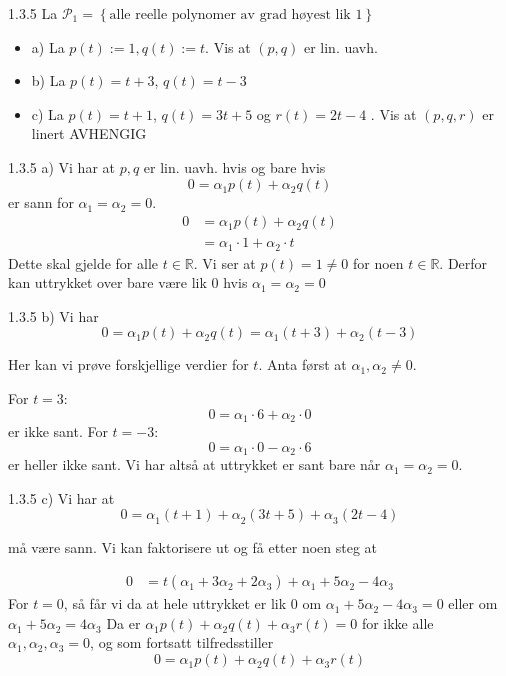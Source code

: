 \documentclass[a4paper,norsk]{article}
\begin{document}
\begin{oppgavebox}{1.3.5}{}
La $ \mathcal{P}_1  = \left\{ \text{alle reelle polynomer av grad høyest lik 1} \right\} $ 
\begin{itemize}
    \item a) La $ p(t):= 1 , q(t) := t$. Vis at $ \left( p, q \right)  $ er lin. uavh.
    \item b) La $ p(t) = t+3 $, $ q(t) = t-3 $  
    \item c) La $ p(t) =t+1 $, $ q(t) = 3t+5 $ og $ r(t) = 2t - 4 $ . Vis at $ \left( p, q, r \right)  $ er linert AVHENGIG
\end{itemize}
\end{oppgavebox}


\begin{proofbox}{1.3.5 a)}{}
Vi har at $ p, q $ er lin. uavh. hvis og bare hvis 
\[
    0 = \alpha_{1}^{} p(t) + \alpha_{2}^{} q(t)
\]
er sann for $ \alpha_{1}^{} =\alpha_{2}^{} =0 $. 
\begin{align*}
    0 &= \alpha_{1}^{} p(t) + \alpha_{2}^{} q(t)\\
    &= \alpha_{1}^{} \cdot 1 + \alpha_{2}^{} \cdot t
\end{align*}
Dette skal gjelde for alle $ t \in  \mathbb{R} $. Vi ser at $ p(t) = 1 \neq 0  $ for noen $ t \in  \mathbb{R} $. Derfor kan uttrykket over bare være lik 0 hvis $ \alpha_{1}^{} = \alpha_{2}^{} =0 $ 
\end{proofbox}

\begin{proofbox}{1.3.5 b)}{}
Vi har
$$
  0 = \alpha_{1} p(t) + \alpha_{2} q(t) = \alpha_{1} \left( t+3 \right)  + \alpha_{2} \left( t-3 \right) 
$$

Her kan vi prøve forskjellige verdier for $t$. Anta først at $\alpha_{1}, \alpha_{2} \neq 0$.

For $t = 3$:
\[
  0 = \alpha_{1} \cdot 6 + \alpha_{2} \cdot 0
\]
er ikke sant. For $t = -3$:
\[
  0 = \alpha_{1} \cdot 0 - \alpha_{2} \cdot 6
\]
er heller ikke sant. Vi har altså at uttrykket er sant bare når $\alpha_{1} = \alpha_{2} = 0$.
\end{proofbox}

\begin{proofbox}{1.3.5 c)}{}
Vi har at 
\[
    0 = \alpha_{1}^{} \left( t + 1 \right) + \alpha_{2}^{} \left( 3t + 5 \right) + \alpha_{3}^{} \left( 2t -4  \right) 
\]

må være sann. Vi kan faktorisere ut og få etter noen steg at 

\begin{align*}
    0 &= t \left( \alpha_{1}^{} + 3 \alpha_{2}^{} + 2 \alpha_{3}^{}  \right) + \alpha_{1}^{} + 5 \alpha_{2}^{} - 4 \alpha_{3}^{} 
\end{align*}
For $ t=0 $, så får vi da at hele uttrykket er lik 0 om $ \alpha_{1}^{} + 5 \alpha_{2}^{} - 4 \alpha_{3}^{} =0 $  eller om $ \alpha_{1}^{} + 5 \alpha_{2}^{} = 4 \alpha_{3}^{}  $ 
Da er $ \alpha_{1}^{} p(t) + \alpha_{2}^{} q(t) + \alpha_{3}^{} r(t) = 0 $ for ikke alle $ \alpha_{1}^{}, \alpha_{2}^{}, \alpha_{3}^{} =0 $, og som fortsatt tilfredsstiller 
\[
    0 = \alpha_{1}^{} p(t) + \alpha_{2}^{} q(t) + \alpha_{3}^{} r(t)
\]
\end{proofbox}
\end{document}
